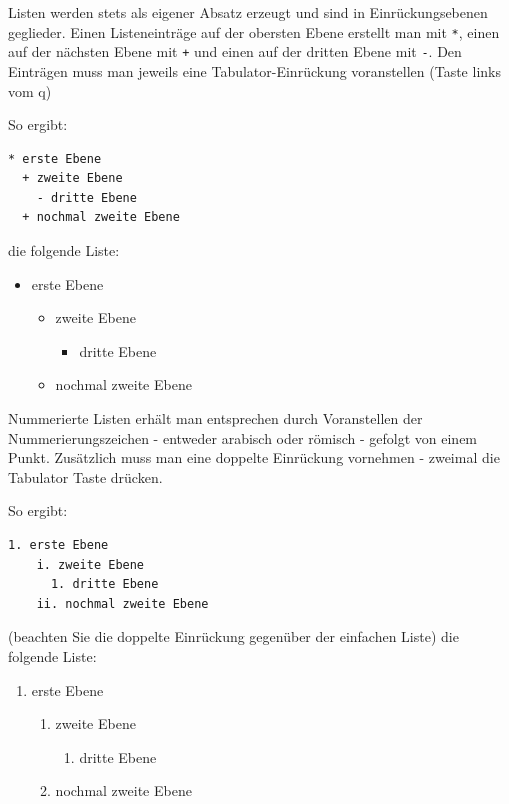 \documentclass[
]{article}
\providecommand{\tightlist}{%
  \setlength{\itemsep}{0pt}\setlength{\parskip}{0pt}}
\begin{document}
Listen werden stets als eigener Absatz erzeugt und sind in
Einrückungsebenen geglieder. Einen Listeneinträge auf der obersten Ebene
erstellt man mit \texttt{*}, einen auf der nächsten Ebene mit \texttt{+}
und einen auf der dritten Ebene mit \texttt{-}. Den Einträgen muss man
jeweils eine Tabulator-Einrückung voranstellen (Taste links vom q)

So ergibt:

\begin{verbatim}
* erste Ebene
  + zweite Ebene
    - dritte Ebene
  + nochmal zweite Ebene
\end{verbatim}

die folgende Liste:

\begin{itemize}
\tightlist
\item
  erste Ebene

  \begin{itemize}
  \tightlist
  \item
    zweite Ebene

    \begin{itemize}
    \tightlist
    \item
      dritte Ebene
    \end{itemize}
  \item
    nochmal zweite Ebene
  \end{itemize}
\end{itemize}

Nummerierte Listen erhält man entsprechen durch Voranstellen der
Nummerierungszeichen - entweder arabisch oder römisch - gefolgt von
einem Punkt. Zusätzlich muss man eine doppelte Einrückung vornehmen -
zweimal die Tabulator Taste drücken.

So ergibt:

\begin{verbatim}
1. erste Ebene
    i. zweite Ebene
      1. dritte Ebene
    ii. nochmal zweite Ebene
\end{verbatim}

(beachten Sie die doppelte Einrückung gegenüber der einfachen Liste) die
folgende Liste:

\begin{enumerate}
\def\labelenumi{\arabic{enumi}.}
\tightlist
\item
  erste Ebene

  \begin{enumerate}
  \def\labelenumii{\roman{enumii}.}
  \tightlist
  \item
    zweite Ebene

    \begin{enumerate}
    \def\labelenumiii{\arabic{enumiii}.}
    \tightlist
    \item
      dritte Ebene
    \end{enumerate}
  \item
    nochmal zweite Ebene
  \end{enumerate}
\end{enumerate}
\end{document}

